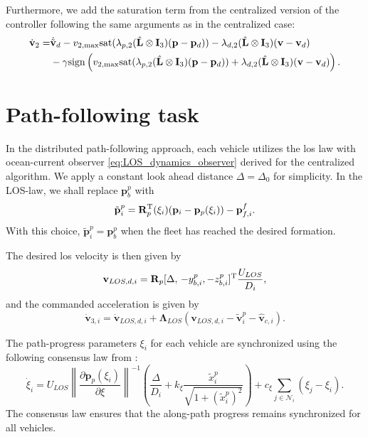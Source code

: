 Furthermore, we add the saturation term from the centralized version of the controller following the same arguments as in the centralized case:
\begin{equation}\label{eq:distributed_formation_acceleration}
\begin{split}
     \dot{\mathbf{v}}_2 = &\dot{\Tilde{\mathbf{v}}}_{d} - v_{2,\max}\mathrm{sat}(\lambda_{p,2}(\hat{\mathbf{L}}\otimes \mathbf{I}_3)(\mathbf{p}-\mathbf{p}_d)) - \lambda_{d,2}(\hat{\mathbf{L}}\otimes \mathbf{I}_3)(\mathbf{v} - \mathbf{v}_d)  \\
     &-\gamma \mathrm{sign}\left(v_{2,\max}\mathrm{sat}(\lambda_{p,2}(\hat{\mathbf{L}}\otimes \mathbf{I}_3)(\mathbf{p}-\mathbf{p}_d)) + \lambda_{d,2}(\hat{\mathbf{L}}\otimes \mathbf{I}_3)(\mathbf{v} - \mathbf{v}_d)\right).
\end{split}
\end{equation}

\section{Path-following task}
In the distributed path-following approach, each vehicle utilizes the \gls{los} law with ocean-current observer \eqref{eq:LOS_dynamics_observer} derived for the centralized algorithm. We apply a constant look ahead distance $\Delta = \Delta_0$ for simplicity. In the LOS-law, we shall replace $\mathbf{p}_b^p$ with
\begin{equation}\label{eq:barycenter-estimate-novel}
    \tilde{\mathbf{p}}_i^p = \mathbf{R}_p^{\rm T}(\xi_i) (\mathbf{p}_i - \mathbf{p}_p(\xi_i)) -  \mathbf{p}_{f,i}^f.
\end{equation}
With this choice, $\tilde{\mathbf{p}}_i^p = \mathbf{p}_b^p$ when the fleet has reached the desired formation.

The desired \gls{los} velocity is then given by
\begin{equation}\label{eq:desired_LOS_non_adaptive}
    \mathbf{v}_{LOS,d,i} = \mathbf{R}_p[\Delta, \, -y_{b,i}^p, -z_{b,i}^p]^{\rm T}\frac{U_{LOS}}{D_i},
\end{equation}
and the commanded acceleration is given by
\begin{equation}\label{eq:distributed_v3_dot}
    \dot{\mathbf{v}}_{3,i} = \dot{\mathbf{v}}_{LOS,d,i} + \bm{\Lambda}_{LOS} \left(\mathbf{v}_{LOS,d,i} - \tilde{\mathbf{v}}_i^p -\hat{\mathbf{v}}_{c,i}\right).
\end{equation}

The path-progress parameters $\xi_i$ for each vehicle are synchronized using the following consensus law from \cite{matous_formation_2023}:
\begin{equation}\label{eq:path_update_consensus}
    \dot{\xi}_i = U_{LOS}\left \| \frac{\partial \mathbf{p}_p(\xi_i)}{\partial \xi}\right \|^{-1} \left (\frac{\Delta}{D_i} +  k_\xi\frac{\tilde{x}_{i}^p}{\sqrt{1 + (\tilde{x}_{i}^p)^2}} \right ) + c_\xi \sum_{j\in \mathcal{N}_i} (\xi_j - \xi_i).
\end{equation}
The consensus law ensures that the along-path progress remains synchronized for all vehicles.



